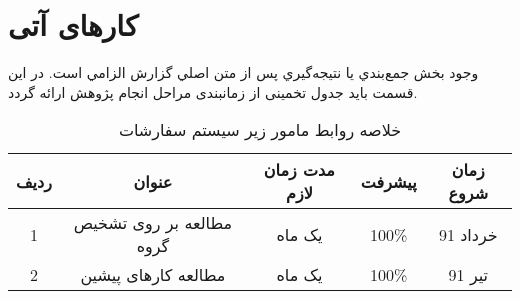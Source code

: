 \section{کارهای آتی}
\label{sec:future}
وجود بخش جمع‌بندي يا نتيجه‌گيري پس از متن اصلي گزارش الزامي است. در این قسمت باید جدول تخمینی از زمانبندی مراحل انجام پژوهش ارائه گردد.

\begin{table}[H] 
	\centering \caption{خلاصه روابط مامور  زیر سیستم سفارشات}

	\begin{tabular}{|c |c|c|c|c|}
		\hline
		\hline
		 ردیف & عنوان & مدت زمان لازم & پیشرفت & زمان شروع
	 \\
		\hline
		\hline
		
		1‎ &مطالعه بر روی تشخیص گروه & یک ماه &100\% &خرداد 91
		\\
		\hline
		2 &مطالعه کارهای پیشین &یک ماه &100\%  &تیر 91\\
		\hline
		
	 
	\end{tabular}
\end{table}
